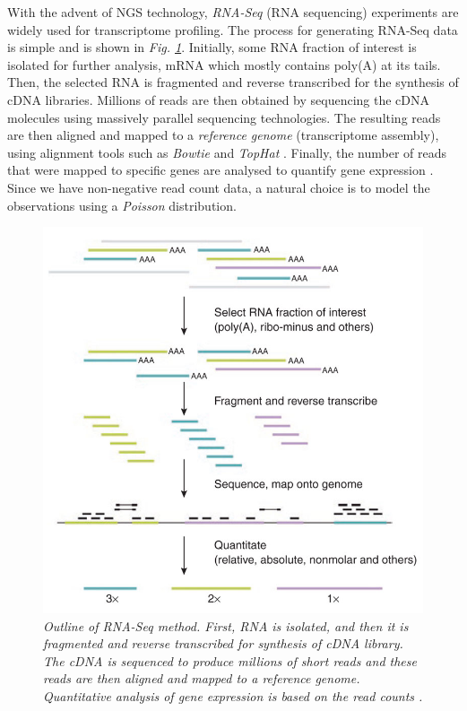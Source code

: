 With the advent of NGS technology, \emph{RNA-Seq} (RNA sequencing) experiments \citep{Wang2009} are widely used for transcriptome profiling. The process for generating RNA-Seq data is simple and is shown in \emph{Fig. \ref{rnaSeq-pic}}. Initially, some RNA fraction of interest is isolated for further analysis, \eg mRNA which mostly contains poly(A) at its tails. Then, the selected RNA is fragmented and reverse transcribed for the synthesis of cDNA libraries. Millions of reads are then obtained by sequencing the cDNA molecules using massively parallel sequencing technologies. The resulting reads are then aligned and mapped to a \emph{reference genome} (\ie transcriptome assembly), using alignment tools such as \emph{Bowtie} \citep{Langmead2009} and \emph{TopHat} \citep{Trapnell2009}. Finally, the number of reads that were mapped to specific genes are analysed to quantify gene expression \citep{Pepke2009}. Since we have non-negative read count data, a natural choice is to model the observations using a \emph{Poisson} distribution.
\begin{figure}[!ht]
\begin{center}
 \includegraphics[scale = 0.37]{images/rna-seq}
\caption{\emph{Outline of RNA-Seq method. First, RNA is isolated, and then it is fragmented and reverse transcribed for synthesis of cDNA library. The cDNA is sequenced to produce millions of short reads and these reads are then aligned and mapped to a reference genome. Quantitative analysis of gene expression is based on the read counts \citep{Pepke2009}.}}
\label{rnaSeq-pic}
\end{center}
\end{figure}

